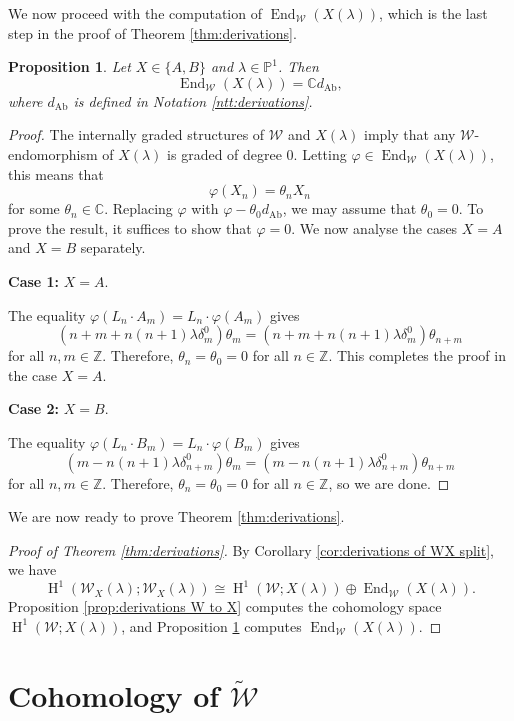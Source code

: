 \documentclass[11pt, svgnames]{amsart}
\DeclareMathOperator{\End}{End}
\newcommand{\ZZ}{\mathbb{Z}}
\newcommand{\CC}{\mathbb{C}}
\newcommand{\PP}{\mathbb{P}}
\newcommand{\W}{\mathcal{W}}
\DeclareMathOperator{\HH}{H}
\DeclareMathOperator{\Ab}{Ab}
\newcommand{\case}[2]{\vspace{2mm} \textbf{Case #1:} #2 \vspace{2mm}}
\newtheorem{proposition}{Proposition}[section]
\theoremstyle{definition}
\begin{document}
We now proceed with the computation of $\End_\W(X(\lambda))$, which is the last step in the proof of Theorem \ref{thm:derivations}.

\begin{proposition}\label{prop:endomorphisms of X}
    Let $X \in \{A,B\}$ and $\lambda \in \PP^1$. Then
    $$\End_\W(X(\lambda)) = \CC d_{\Ab},$$
    where $d_{\Ab}$ is defined in Notation \ref{ntt:derivations}.
\end{proposition}
\begin{proof}
    The internally graded structures of $\W$ and $X(\lambda)$ imply that any $\W$-endomorphism of $X(\lambda)$ is graded of degree 0. Letting $\varphi \in \End_\W(X(\lambda))$, this means that
    $$\varphi(X_n) = \theta_n X_n$$
    for some $\theta_n \in \CC$. Replacing $\varphi$ with $\varphi - \theta_0 d_{\Ab}$, we may assume that $\theta_0 = 0$. To prove the result, it suffices to show that $\varphi = 0$. We now analyse the cases $X = A$ and $X = B$ separately.

    \case{1}{$X = A$.}

    The equality $\varphi(L_n \cdot A_m) = L_n \cdot \varphi(A_m)$ gives
    $$(n + m + n(n + 1) \lambda \delta_m^0)\theta_m = (n + m + n(n + 1) \lambda \delta_m^0)\theta_{n+m}$$
    for all $n,m \in \ZZ$. Therefore, $\theta_n = \theta_0 = 0$ for all $n \in \ZZ$. This completes the proof in the case $X = A$.

    \case{2}{$X = B$.}

    The equality $\varphi(L_n \cdot B_m) = L_n \cdot \varphi(B_m)$ gives
    $$(m - n(n + 1)\lambda \delta_{n+m}^0)\theta_m = (m - n(n + 1)\lambda \delta_{n+m}^0)\theta_{n+m}$$
    for all $n,m \in \ZZ$. Therefore, $\theta_n = \theta_0 = 0$ for all $n \in \ZZ$, so we are done.
\end{proof}

We are now ready to prove Theorem \ref{thm:derivations}.

\begin{proof}[Proof of Theorem \ref{thm:derivations}]
    By Corollary \ref{cor:derivations of WX split}, we have
    $$\HH^1(\W_X(\lambda);\W_X(\lambda)) \cong \HH^1(\W;X(\lambda)) \oplus \End_\W(X(\lambda)).$$
    Proposition \ref{prop:derivations W to X} computes the cohomology space $\HH^1(\W;X(\lambda))$, and Proposition \ref{prop:endomorphisms of X} computes $\End_\W(X(\lambda))$.
\end{proof}

\section{Cohomology of \texorpdfstring{$\widetilde{\W}$}{W tilde}}\label{sec:W tilde}
\end{document}
